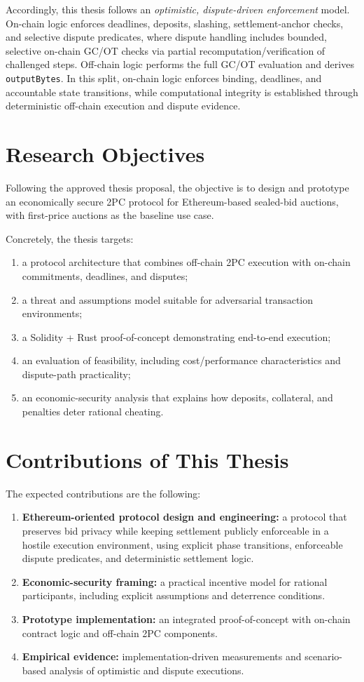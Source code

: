 \documentclass[final,twoside]{vutinfth}
\begin{document}
Accordingly, this thesis follows an \emph{optimistic, dispute-driven enforcement} model.
On-chain logic enforces deadlines, deposits, slashing, settlement-anchor checks,
and selective dispute predicates, where dispute handling includes bounded,
selective on-chain GC/OT checks via partial recomputation/verification of
challenged steps. Off-chain logic performs the full GC/OT evaluation and
derives \texttt{outputBytes}. In this split, on-chain logic enforces binding,
deadlines, and accountable state transitions, while computational integrity is
established through deterministic off-chain execution and dispute evidence.

\section{Research Objectives}
Following the approved thesis proposal, the objective is to design and prototype an economically secure 2PC protocol for Ethereum-based sealed-bid auctions, with first-price auctions as the baseline use case.

Concretely, the thesis targets:
\begin{enumerate}
\item a protocol architecture that combines off-chain 2PC execution with on-chain commitments, deadlines, and disputes;
\item a threat and assumptions model suitable for adversarial transaction environments;
\item a Solidity + Rust proof-of-concept demonstrating end-to-end execution;
\item an evaluation of feasibility, including cost/performance characteristics and dispute-path practicality;
\item an economic-security analysis that explains how deposits, collateral, and penalties deter rational cheating.
\end{enumerate}

\section{Contributions of This Thesis}
The expected contributions are the following:
\begin{enumerate}
\item \textbf{Ethereum-oriented protocol design and engineering:} a protocol that preserves bid privacy while keeping settlement publicly enforceable in a hostile execution environment, using explicit phase transitions, enforceable dispute predicates, and deterministic settlement logic.
\item \textbf{Economic-security framing:} a practical incentive model for rational participants, including explicit assumptions and deterrence conditions.
\item \textbf{Prototype implementation:} an integrated proof-of-concept with on-chain contract logic and off-chain 2PC components.
\item \textbf{Empirical evidence:} implementation-driven measurements and scenario-based analysis of optimistic and dispute executions.
\end{enumerate}
\end{document}
